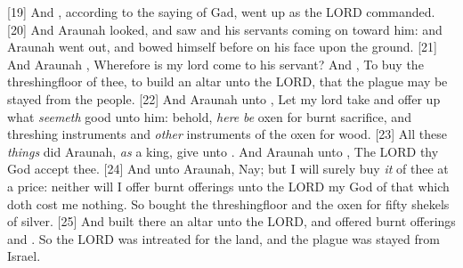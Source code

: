 [19] \textcolor[cmyk]{0.99998,1,0,0}{And  , according to the saying of Gad, went up as the LORD commanded.}
[20] \textcolor[cmyk]{0.99998,1,0,0}{And Araunah looked, and saw   and his servants coming on toward him: and Araunah went out, and bowed himself before   on his face upon the ground.}
[21] \textcolor[cmyk]{0.99998,1,0,0}{And Araunah  , Wherefore is my lord   come to his servant? And    , To buy the threshingfloor of thee, to build an altar unto the LORD, that the plague may be stayed from the people.}
[22] \textcolor[cmyk]{0.99998,1,0,0}{And Araunah   unto  , Let my lord   take and offer up what \emph{seemeth} good unto him: behold, \emph{here} \emph{be} oxen for burnt sacrifice, and threshing instruments and \emph{other} instruments of the oxen for wood.}
[23] \textcolor[cmyk]{0.99998,1,0,0}{All these \emph{things} did Araunah, \emph{as} a king, give unto  . And Araunah   unto  , The LORD thy God accept thee.}
[24] \textcolor[cmyk]{0.99998,1,0,0}{And     unto Araunah, Nay; but I will surely buy \emph{it} of thee at a price: neither will I offer burnt offerings unto the LORD my God of that which doth cost me nothing. So   bought the threshingfloor and the oxen for fifty shekels of silver.}
[25] \textcolor[cmyk]{0.99998,1,0,0}{And   built there an altar unto the LORD, and offered burnt offerings and . So the LORD was intreated for the land, and the plague was stayed from Israel.}
